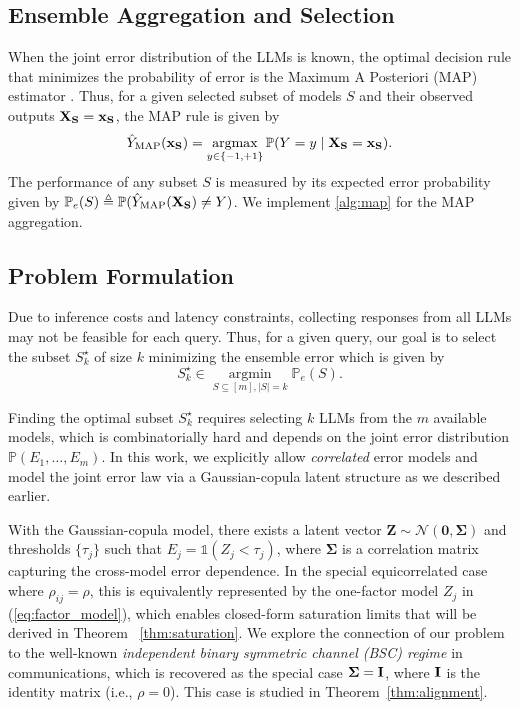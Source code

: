 \documentclass{article}
\theoremstyle{plain}
\theoremstyle{definition}
\theoremstyle{remark}
\begin{document}
\subsection{Ensemble Aggregation and Selection}
When the joint error distribution of the LLMs is known, the optimal decision rule that minimizes the probability of error is the Maximum A Posteriori (MAP) estimator \citep{hajek2020probability}. Thus, for a given selected subset of models $S$ and their observed outputs ${\bf X_S} = {\bf x_S}$, the MAP rule is given by 
\begin{equation}
    \hat{Y}_{\text{MAP}}({\bf x_S}) = \operatorname*{argmax}_{y \in \{-1, +1\}} \mathbb{P}(Y=y \mid {\bf X_S} = {\bf x_S}).
\end{equation}
The performance of any subset $S$ is measured by its expected error probability given by $\mathbb{P}_e(S) \triangleq \mathbb{P}(\hat{Y}_{\text{MAP}}({\bf X_S}) \neq Y)$. We implement \cref{alg:map} for the MAP aggregation. 

\subsection{Problem Formulation}
Due to inference costs and latency constraints, collecting responses from all LLMs may not be feasible for each query. Thus, for a given query, our goal is to select the subset $S^{\star}_{k}$ of size $k$ minimizing the ensemble error which is given by
\begin{equation}
\label{eq:problem_statement}
    S^\star_k \in \operatorname*{argmin}_{S \subseteq [m], |S|=k} \mathbb{P}_e(S).
\end{equation}

Finding the optimal subset $S_k^\star$ requires selecting $k$ LLMs from the $m$ available models, which is combinatorially hard and depends on the joint error distribution $\mathbb{P}(E_1,\dots,E_m)$. In this work,  we explicitly allow \emph{correlated}  error models and model the joint error law via a Gaussian-copula latent structure as we described earlier. 


With the Gaussian-copula model, there exists a latent vector $\mathbf{Z} \sim \mathcal{N}(\mathbf{0}, \mathbf{\Sigma})$ and thresholds $\{\tau_j\}$ such that
$E_j=\mathds{1}(Z_j<\tau_j)$, where $\mathbf{\Sigma}$ is a correlation matrix capturing the cross-model error dependence.
In the special equicorrelated case where $\rho_{ij}=\rho$, this is equivalently represented by the one-factor model
$Z_j$ in (\ref{eq:factor_model}), which enables closed-form saturation limits  that will be derived in Theorem ~\ref{thm:saturation}.  We explore the connection of our problem to the well-known \emph{independent binary symmetric channel (BSC) regime} in communications, which is recovered as the special case ${\bf \Sigma }= {\bf I}$, where ${\bf I}$ is the identity matrix (i.e., $\rho = 0$). This case is studied in Theorem~\ref{thm:alignment}.
\end{document}
